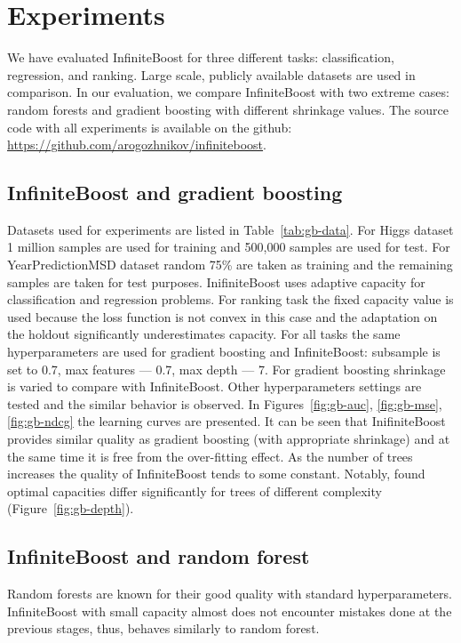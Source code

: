 \section{Experiments}
We have evaluated InfiniteBoost for three different tasks: classification, regression, and ranking. 
Large scale, publicly available datasets are used in comparison. 
In our evaluation, we compare InfiniteBoost with two extreme cases: random forests and gradient boosting with different shrinkage values.
The source code with all experiments is available on the github: \url{https://github.com/arogozhnikov/infiniteboost}.

\insertplotsgbarxiv
\insertplotsforestarxiv

\subsection{InfiniteBoost and gradient boosting}
Datasets used for experiments are listed in Table~\ref{tab:gb-data}. 
For Higgs dataset 1 million samples are used for training and 500,000 samples are used for test. 
For YearPredictionMSD dataset random 75\% are taken as training and the remaining samples are taken for test purposes.
InifiniteBoost uses adaptive capacity for classification and regression problems.
For ranking task the fixed capacity value is used because the loss function is not convex in this case and the adaptation on the holdout significantly underestimates capacity.
For all tasks the same hyperparameters are used for gradient boosting and InfiniteBoost: subsample is set to 0.7, max features --- 0.7, max depth --- 7. 
For gradient boosting shrinkage is varied to compare with InfiniteBoost.
Other hyperparameters settings are tested and the similar behavior is observed.
In Figures~\ref{fig:gb-auc}, \ref{fig:gb-mse}, \ref{fig:gb-ndcg} the learning curves are presented.
It can be seen that InifiniteBoost provides similar quality as gradient boosting (with appropriate shrinkage) and at the same time it is free from the over-fitting effect. 
As the number of trees increases the quality of InfiniteBoost tends to some constant.
Notably, found optimal capacities differ significantly for trees of different complexity (Figure~\ref{fig:gb-depth}).

\insertplotsgbnips

\subsection{InfiniteBoost and random forest}
Random forests are known for their good quality with standard hyperparameters.
InfiniteBoost with small capacity almost does not encounter mistakes done at the previous stages,
thus, behaves similarly to random forest.

